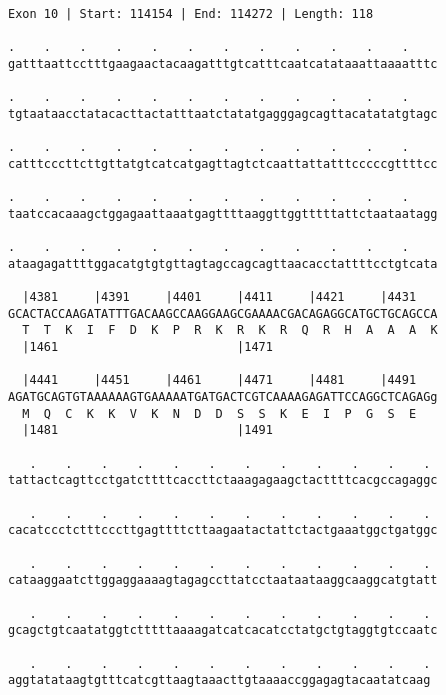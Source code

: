 \documentclass{article}
\begin{document}
\begin{Verbatim}
Exon 10 | Start: 114154 | End: 114272 | Length: 118
 
.    .    .    .    .    .    .    .    .    .    .    .    
gatttaattcctttgaagaactacaagatttgtcatttcaatcatataaattaaaatttc
  
.    .    .    .    .    .    .    .    .    .    .    .    
tgtaataacctatacacttactatttaatctatatgagggagcagttacatatatgtagc
  
.    .    .    .    .    .    .    .    .    .    .    .    
catttcccttcttgttatgtcatcatgagttagtctcaattattatttcccccgttttcc
  
.    .    .    .    .    .    .    .    .    .    .    .    
taatccacaaagctggagaattaaatgagttttaaggttggtttttattctaataatagg
  
.    .    .    .    .    .    .    .    .    .    .    .    
ataagagattttggacatgtgtgttagtagccagcagttaacacctattttcctgtcata
  
  |4381     |4391     |4401     |4411     |4421     |4431   
GCACTACCAAGATATTTGACAAGCCAAGGAAGCGAAAACGACAGAGGCATGCTGCAGCCA
  T  T  K  I  F  D  K  P  R  K  R  K  R  Q  R  H  A  A  A  K
  |1461                         |1471                       
  
  |4441     |4451     |4461     |4471     |4481     |4491   
AGATGCAGTGTAAAAAAGTGAAAAATGATGACTCGTCAAAAGAGATTCCAGGCTCAGAGg
  M  Q  C  K  K  V  K  N  D  D  S  S  K  E  I  P  G  S  E   
  |1481                         |1491                       
  
   .    .    .    .    .    .    .    .    .    .    .    . 
tattactcagttcctgatcttttcaccttctaaagagaagctacttttcacgccagaggc
  
   .    .    .    .    .    .    .    .    .    .    .    . 
cacatccctctttcccttgagttttcttaagaatactattctactgaaatggctgatggc
  
   .    .    .    .    .    .    .    .    .    .    .    . 
cataaggaatcttggaggaaaagtagagccttatcctaataataaggcaaggcatgtatt
  
   .    .    .    .    .    .    .    .    .    .    .    . 
gcagctgtcaatatggtctttttaaaagatcatcacatcctatgctgtaggtgtccaatc
  
   .    .    .    .    .    .    .    .    .    .    .    .
aggtatataagtgtttcatcgttaagtaaacttgtaaaaccggagagtacaatatcaag
\end{Verbatim}
\newpage
\end{document}

